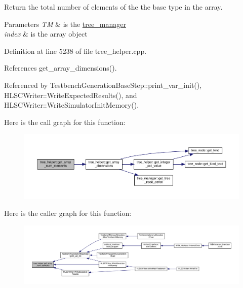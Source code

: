Return the total number of elements of the the base type in the array. 


\begin{DoxyParams}{Parameters}
{\em TM} & is the \hyperlink{classtree__manager}{tree\+\_\+manager} \\
\hline
{\em index} & is the array object \\
\hline
\end{DoxyParams}


Definition at line 5238 of file tree\+\_\+helper.\+cpp.



References get\+\_\+array\+\_\+dimensions().



Referenced by Testbench\+Generation\+Base\+Step\+::print\+\_\+var\+\_\+init(), H\+L\+S\+C\+Writer\+::\+Write\+Expected\+Results(), and H\+L\+S\+C\+Writer\+::\+Write\+Simulator\+Init\+Memory().

Here is the call graph for this function\+:
\nopagebreak
\begin{figure}[H]
\begin{center}
\leavevmode
\includegraphics[width=350pt]{d7/d99/classtree__helper_a81cf8c1b36aa54a55aa4d543425531ab_cgraph}
\end{center}
\end{figure}
Here is the caller graph for this function\+:
\nopagebreak
\begin{figure}[H]
\begin{center}
\leavevmode
\includegraphics[width=350pt]{d7/d99/classtree__helper_a81cf8c1b36aa54a55aa4d543425531ab_icgraph}
\end{center}
\end{figure}
\mbox{\label{classtree__helper_abbcd4e867eb68219baaea379858277b5}} 
